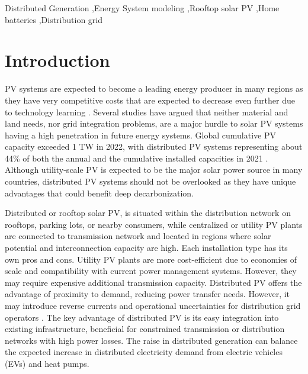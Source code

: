 \documentclass[review]{elsarticle}
\begin{document}
\begin{frontmatter}
		
		
		\begin{keyword}
			Distributed Generation \sep Energy System modeling \sep Rooftop solar PV \sep Home batteries \sep Distribution grid
			
		\end{keyword}
		
	\end{frontmatter}
	
	
	\section{Introduction}
	
	PV systems are expected to become a leading energy producer in many regions as they have very competitive costs that are expected to decrease even further due to technology learning \cite{victoria_2021, IEA_2020}. Several studies \cite{victoria_2021, haegel2023photovoltaics} have argued that neither material and land needs, nor grid integration problems, are a major hurdle to solar PV systems having a high penetration in future energy systems. Global cumulative PV capacity exceeded 1 TW in 2022, with distributed PV systems representing about 44\% of both the annual and the cumulative installed capacities in 2021 \cite{IEAPVPS_2021}. Although utility-scale PV is expected to be the major solar power source in many countries, distributed PV systems should not be overlooked as they have unique advantages that could benefit deep decarbonization. 
	
	Distributed or rooftop solar PV, is situated within the distribution network on rooftops, parking lots, or nearby consumers, while centralized or utility PV plants are connected to transmission network and located in regions where solar potential and interconnection capacity are high. Each installation type has its own pros and cons. Utility PV plants are more cost-efficient due to economies of scale and compatibility with current power management systems. However, they may require expensive additional transmission capacity. Distributed PV offers the advantage of proximity to demand, reducing power transfer needs. However, it may introduce reverse currents and operational uncertainties for distribution grid operators \cite{wilkinson2021rooftop, van2018pv, burger_2019}. The key advantage of distributed PV is its easy integration into existing infrastructure, beneficial for constrained transmission or distribution networks with high power losses. The raise in distributed generation can balance the expected increase in distributed electricity demand from electric vehicles (EVs) and heat pumps. 
	
\end{document}
